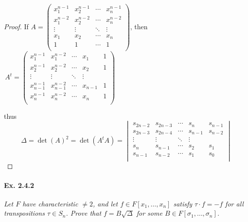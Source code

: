 \documentclass[11pt,a4paper]{article}
\begin{document}
\begin{proof}
If  $A = 
\begin{pmatrix}
x_1^{n-1}&  x_2^{n-1} &   \cdots   & x_n^{n-1}\\
x_1^{n-2}&  x_2^{n-2} &   \cdots   & x_n^{n-2}\\
\vdots & \vdots & \ddots & \vdots\\
x_1&  x_2 &   \cdots   & x_n\\
1    & 1     &   \cdots    & 1\\
\end{pmatrix}
$, then $\,A^t= 
\begin{pmatrix}
x_1^{n-1}&  x_1^{n-2} &   \cdots  &x_1 & 1\\
x_2^{n-1}&  x_2^{n-2} &   \cdots   &x_2 & 1\\
\vdots & \vdots & \ddots & \vdots\\
x_{n-1}^{n-1}   &x_{n-1}^{n-2}   &   \cdots  &x_{n-1}   & 1\\
x_n^{n-1}   &x_n^{n-2}   &   \cdots  &x_n   & 1\\
\end{pmatrix}$

thus $$\Delta = \det(A)^2 = \det(A^t A)= 
\begin{vmatrix}
s_{2n-2} &  s_{2n-3} &   \cdots   &s_{n}    & s_{n-1}\\
s_{2n-3}&  s_{2n-4} &   \cdots   &s_{n-1}  & s_{n-2}\\
\vdots     & \vdots     & \ddots      & \vdots      &       \\
s_{n}      & s_{n-1}   &   \cdots    &s_{2}    & s_{1} \\
s_{n-1}    &s_{n-2}    &   \cdots    &s_{1}   & s_{0} \\
\end{vmatrix}
$$
\end{proof}

\paragraph{Ex. 2.4.2}

{\it Let $F$ have characteristic $\ne 2$, and let $f \in F[x_1,\ldots,x_n]$ satisfy $\tau \cdot f = -f$ for all transpositions $\tau \in S_n$. Prove that $f = B \sqrt{\Delta}$ for some $B \in F[\sigma_1,\ldots,\sigma_n]$.
}
\end{document}
